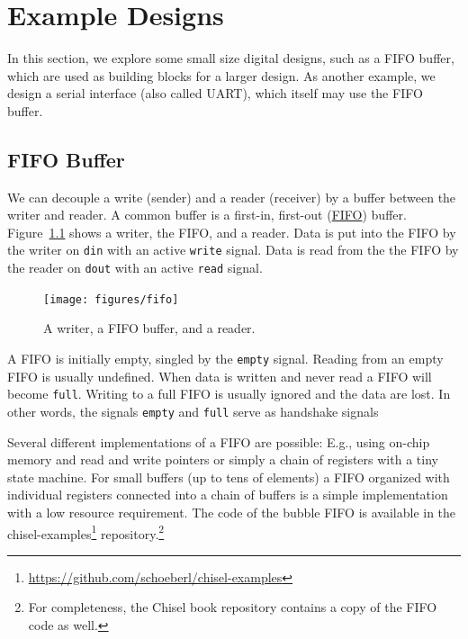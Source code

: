 \documentclass[%
    10pt,
    headinclude, footexclude,
    openright, %
    notitlepage,
    cleardoubleempty,
    headsepline,
    pointlessnumbers,
    bibtotoc, idxtotoc,
    ]{scrbook}
\newcommand{\code}[1]{{\small{\texttt{#1}}}}
\newcommand{\myref}[2]{\href{#1}{#2}}
\renewcommand{\myref}[2]{{#2}{\footnote{\url{#1}}}}
\begin{document}



\chapter{Example Designs}

In this section, we explore some small size digital designs, such as
a FIFO buffer, which are used as building blocks for a larger design.
As another example, we design a serial interface (also called UART),
which itself may use the FIFO buffer.

\section{FIFO Buffer}
\label{sec:fifo}



We can decouple a write (sender) and a reader (receiver) by a buffer
between the writer and reader.
A common buffer is a first-in, first-out
(\href{https://en.wikipedia.org/wiki/FIFO_%28computing_and_electronics%29}{FIFO})
buffer. Figure~\ref{fig:fifo} shows a writer, the FIFO, and a reader.
Data is put into the FIFO by the writer on \code{din} with an active
\code{write} signal. Data is read from the the FIFO by the reader on
\code{dout} with an active \code{read} signal.

\begin{figure}
  \centering
  \texttt{[image: figures/fifo]}
  \caption{A writer, a FIFO buffer, and a reader.}
  \label{fig:fifo}
\end{figure}

A FIFO is initially empty, singled by the \code{empty} signal. Reading
from an empty FIFO is usually undefined. When data is written and never
read a FIFO will become \code{full}. Writing to a full FIFO is usually ignored
and the data are lost. In other words, the signals \code{empty} and \code{full}
serve as handshake signals 

Several different implementations of a FIFO are possible: E.g., using on-chip
memory and read and write pointers or simply a chain of registers with a
tiny state machine. For small buffers (up to tens of elements) a FIFO organized
with individual registers connected into a chain of buffers is a simple
implementation with a low resource requirement.
The code of the bubble FIFO is available in the
\myref{https://github.com/schoeberl/chisel-examples}{chisel-examples}
repository.\footnote{For completeness, the Chisel book repository contains
a copy of the FIFO code as well.}
\end{document}

